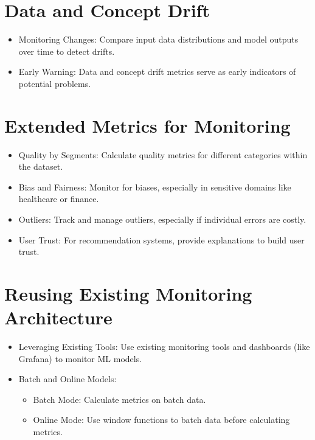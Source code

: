 \documentclass[letterpaper,12pt,notitlepage,twoside]{report}
\begin{document}
\section{Data and Concept Drift}
\begin{itemize}
    \item Monitoring Changes: Compare input data distributions and model outputs over time to detect drifts.
    \item Early Warning: Data and concept drift metrics serve as early indicators of potential problems.
\end{itemize}

\section{Extended Metrics for Monitoring}
\begin{itemize}
    \item Quality by Segments: Calculate quality metrics for different categories within the dataset.
    \item Bias and Fairness: Monitor for biases, especially in sensitive domains like healthcare or finance.
    \item Outliers: Track and manage outliers, especially if individual errors are costly.
    \item User Trust: For recommendation systems, provide explanations to build user trust.
\end{itemize}

\section{Reusing Existing Monitoring Architecture}
\begin{itemize}
    \item Leveraging Existing Tools: Use existing monitoring tools and dashboards (like Grafana) to monitor ML models.
    \item Batch and Online Models:
    \begin{itemize}
        \item Batch Mode: Calculate metrics on batch data.
        \item Online Mode: Use window functions to batch data before calculating metrics.
    \end{itemize}
\end{itemize}
\end{document}
